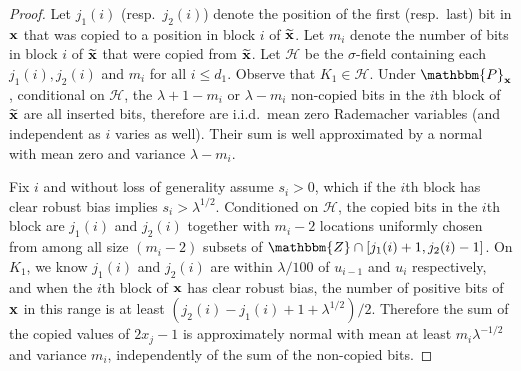 \documentclass[final,12pt]{colt2018} %
\newcommand{\Z}{\mathbbm{Z}}
\renewcommand{\P}{\mathbbm{P}}
\newcommand{\1}{\mathbf{1}}
\def\cH{\mathcal{H}}
\newcommand{\wt}{\widetilde}
\def\xt{{\wt {\bf x}}}
\def\x{{\bf x}}
\begin{document}
\begin{proof}
	Let $j_1 (i)$ (resp.\ $j_2 (i)$) denote the position of the
	first (resp.\ last) bit in $\x$ that was copied to a
	position in block $i$ of $\xt$.  Let $m_i$ denote the number of
	bits in block $i$ of $\xt$ that were copied from $\xt$.
	Let $\cH$ be the $\sigma$-field containing each $j_1 (i), j_2 (i)$
	and $m_i$ for all $i \leq d_1$. Observe that $K_1\in\cH$. Under $\P_\x$, conditional on $\cH$,
	the $\lambda + 1 - m_i$ or $\lambda - m_i$ non-copied bits in the $i$th block of $\xt$ are
	all inserted bits, therefore are i.i.d.\ mean zero Rademacher variables
	(and independent as $i$ varies as well).  Their sum is well approximated
	by a normal with mean zero and variance $\lambda - m_i$.
	
	Fix $i$ and without loss of generality assume $s_i > 0$, which if
	the $i$th block has clear robust bias implies $s_i > \lambda^{1/2}$.
	Conditioned on $\cH$,
	the copied bits in the $i$th block are $j_1 (i)$ and $j_2 (i)$ together
	with $m_i - 2$ locations uniformly chosen from among all size $(m_i - 2)$ subsets of $\Z\cap[j_1 (i) + 1 , j_2 (i) - 1]$.  On $K_1$, we know $j_1 (i)$ and $j_2 (i)$
	are within $\lambda / 100$ of $u_{i-1}$ and $u_i$ respectively,
	and when the $i$th block of $\x$ has clear robust bias, the number
	of positive bits of $\x$ in this range is at least $(j_2(i)-j_1(i) +1+\lambda^{1/2})/2$.  Therefore the sum of the copied values of
	$2x_j - 1$ is approximately normal with mean at least $m_i \lambda^{-1/2}$
	and variance $m_i$, independently of the sum of the non-copied bits.
	

\end{proof}
\end{document}
